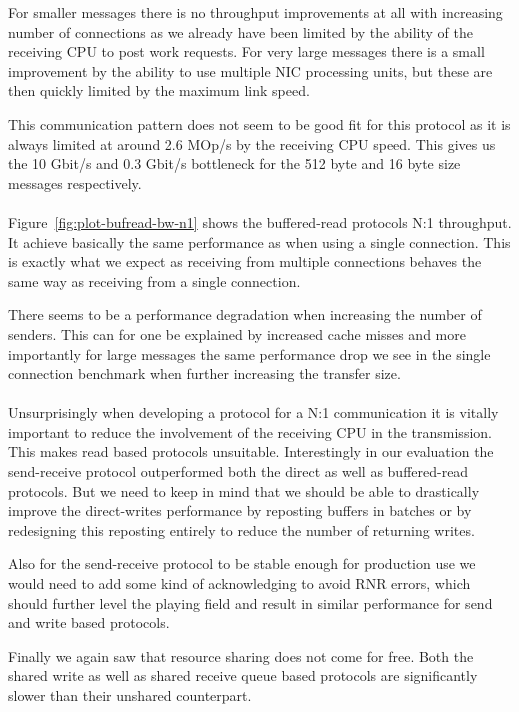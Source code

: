 For smaller messages there is no throughput improvements at all with increasing number of connections as we already have 
been limited by the ability of the receiving CPU to post work requests. For very large messages there is a small improvement 
by the ability to use multiple NIC processing units, but these are then quickly limited by the maximum link speed.

This communication pattern does not seem to be good fit for this protocol as it is always limited at around 
2.6 MOp/s by the receiving CPU speed. This gives us the 10 Gbit/s and 0.3 Gbit/s bottleneck for the 512 byte and 16 byte size
messages respectively.

\paragraph{} Figure~\ref{fig:plot-bufread-bw-n1} shows the buffered-read protocols N:1 throughput. It achieve basically the 
same performance as when using a single connection. This is exactly what we expect as receiving from multiple connections
behaves the same way as receiving from a single connection.

There seems to be a performance degradation when increasing the number of senders. This can for one be explained
by increased cache misses and more importantly for large messages the same performance drop we see in the single connection 
benchmark when further increasing the transfer size.


\paragraph{} Unsurprisingly when developing a protocol for a N:1 communication it is vitally important to reduce the 
involvement of the receiving CPU in the transmission. This makes read based protocols unsuitable. Interestingly in our
evaluation the send-receive protocol outperformed both the direct as well as buffered-read protocols. But we need to 
keep in mind that we should be able to drastically improve the direct-writes performance by reposting buffers in batches or 
by redesigning this reposting entirely to reduce the number of returning writes.

Also for the send-receive protocol to be stable enough for production use we would need to add some kind of acknowledging to
avoid RNR errors, which should further level the playing field and result in similar performance for send and write based 
protocols.

Finally we again saw that resource sharing does not come for free. Both the shared write as well as shared receive queue based
protocols are significantly slower than their unshared counterpart. 








